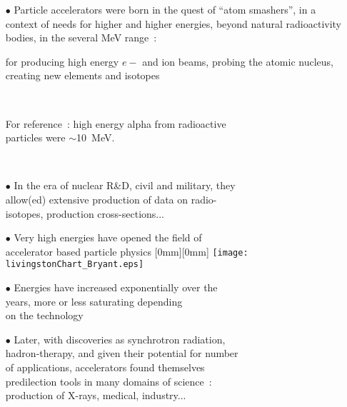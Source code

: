 \documentclass[12pt]{article}
\begin{document}
\begin{itemize}
  \item[$\bullet$] Particle accelerators were born in the quest of  ``atom smashers'', in a context of 
needs for higher and higher  energies, 
beyond natural radioactivity bodies, in the several MeV range~: 

for producing high energy $e-$ and ion beams,  probing the atomic nucleus, 
 creating  new elements and  isotopes 

~

For reference~: high energy alpha from radioactive \\ 
particles were $\sim$10~MeV. 

~

  \item[$\bullet$] In the era of nuclear R\&D, civil and military, they \\
 allow(ed) extensive production of data on radio- \\
isotopes, production cross-sections...
  \item[$\bullet$] Very high energies have opened the field of \\
accelerator based particle physics
\hspace{.18\linewidth} \raisebox{-70mm}[0mm][0mm]{\hspace{0mm}
\texttt{[image: livingstonChart\_Bryant.eps]}
}

  \item[$\bullet$] Energies have increased exponentially over the \\
 years, more or less saturating depending \\
on the technology

  \item[$\bullet$] Later, with discoveries as synchrotron radiation,  \\
hadron-therapy, and given their potential for number \\
of applications, accelerators found themselves  \\
predilection tools in many domains of science~: \\
production of X-rays, medical, industry...
\end{itemize}
\end{document}
